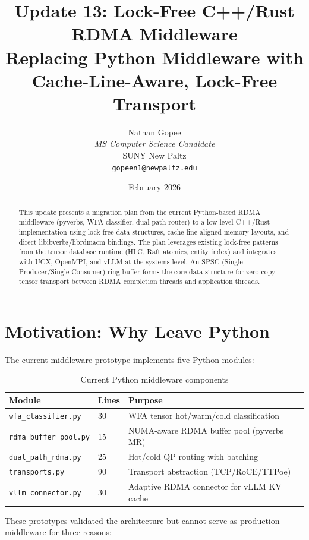\documentclass[11pt,letterpaper]{article}
\title{
    \vspace{-1cm}
    \textbf{Update 13: Lock-Free C++/Rust RDMA Middleware} \\[0.5em]
    \large Replacing Python Middleware with Cache-Line-Aware, Lock-Free Transport
}
\author{
    Nathan Gopee \\
    \textit{MS Computer Science Candidate} \\
    SUNY New Paltz \\
    \texttt{gopeen1@newpaltz.edu}
}
\date{February 2026}
\begin{document}
\maketitle

\begin{abstract}
\noindent
This update presents a migration plan from the current Python-based RDMA middleware (pyverbs, WFA classifier, dual-path router) to a low-level C++/Rust implementation using lock-free data structures, cache-line-aligned memory layouts, and direct libibverbs/librdmacm bindings. The plan leverages existing lock-free patterns from the tensor database runtime (HLC, Raft atomics, entity index) and integrates with UCX, OpenMPI, and vLLM at the systems level. An SPSC (Single-Producer/Single-Consumer) ring buffer forms the core data structure for zero-copy tensor transport between RDMA completion threads and application threads.
\end{abstract}

\section{Motivation: Why Leave Python}

The current middleware prototype implements five Python modules:

\begin{table}[htbp]
\centering
\caption{Current Python middleware components}
\label{tab:python-middleware}
\begin{tabular}{@{}llp{7cm}@{}}
\toprule
\textbf{Module} & \textbf{Lines} & \textbf{Purpose} \\
\midrule
\texttt{wfa\_classifier.py} & 30 & WFA tensor hot/warm/cold classification \\
\texttt{rdma\_buffer\_pool.py} & 15 & NUMA-aware RDMA buffer pool (pyverbs MR) \\
\texttt{dual\_path\_rdma.py} & 25 & Hot/cold QP routing with batching \\
\texttt{transports.py} & 90 & Transport abstraction (TCP/RoCE/TTPoe) \\
\texttt{vllm\_connector.py} & 30 & Adaptive RDMA connector for vLLM KV cache \\
\bottomrule
\end{tabular}
\end{table}

These prototypes validated the architecture but cannot serve as production middleware for three reasons:
\end{document}
